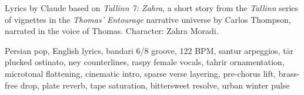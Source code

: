 
\label{sec:the-other-local-girl}
\begin{notes}
Lyrics by Claude based on \emph{Tallinn 7: Zahra}, a short story from the \emph{Tallinn} series of vignettes in the \emph{Thomas’ Entourage} narrative universe by Carlos Thompson, narrated in the voice of Thomas. Character: Zahra Moradi.
\end{notes}
\begin{style}
Persian pop, English lyrics, bandari 6/8 groove, 122 BPM, santur arpeggios, tār plucked ostinato, ney counterlines, raspy female vocals, tahrir ornamentation, microtonal flattening, cinematic intro, sparse verse layering, pre-chorus lift, brass-free drop, plate reverb, tape saturation, bittersweet resolve, urban winter pulse
\end{style}
